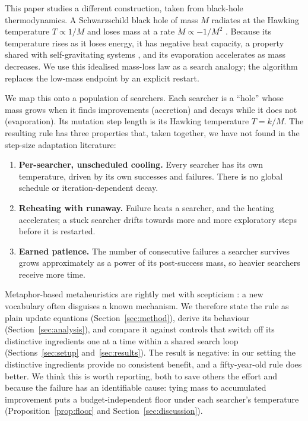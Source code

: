 \documentclass[10pt,a4paper]{article}
\begin{document}
This paper studies a different construction, taken from black-hole
thermodynamics. A Schwarzschild black hole of mass $M$ radiates at the Hawking
temperature $T \propto 1/M$ \citep{hawking1974,hawking1975} and loses mass at a
rate $\dot M \propto -1/M^2$ \citep{page1976}. Because its temperature rises as it
loses energy, it has negative heat capacity, a property shared with
self-gravitating systems \citep{lyndenbell1968,thirring1970}, and its evaporation
accelerates as mass decreases. We use this idealised mass-loss law as a search
analogy; the algorithm replaces the low-mass endpoint by an explicit restart.

We map this onto a population of searchers. Each searcher is a ``hole'' whose
mass grows when it finds improvements (accretion) and decays while it does not
(evaporation). Its mutation step length is its Hawking temperature $T = k/M$. The
resulting rule has three properties that, taken together, we have not found in the
step-size adaptation literature:
\begin{enumerate}
  \item \textbf{Per-searcher, unscheduled cooling.} Every searcher has its own
        temperature, driven by its own successes and failures. There is no global
        schedule or iteration-dependent decay.
  \item \textbf{Reheating with runaway.} Failure heats a searcher, and the heating
        accelerates; a stuck searcher drifts towards more and more exploratory steps
        before it is restarted.
  \item \textbf{Earned patience.} The number of consecutive failures a searcher
        survives grows approximately as a power of its post-success mass, so
        heavier searchers receive more time.
\end{enumerate}

Metaphor-based metaheuristics are rightly met with scepticism
\citep{sorensen2015,camacho2019}: a new vocabulary often disguises a known
mechanism. We therefore state the rule as plain update equations
(Section~\ref{sec:method}), derive its behaviour (Section~\ref{sec:analysis}), and
compare it against controls that switch off its distinctive ingredients one at a
time within a shared search loop (Sections~\ref{sec:setup}
and~\ref{sec:results}). The result is negative: in our setting the distinctive
ingredients provide no consistent benefit, and a fifty-year-old rule \citep{rechenberg1973} does
better. We think this is worth reporting, both to save others the effort and
because the failure has an identifiable cause: tying mass to accumulated
improvement puts a budget-independent floor under each searcher's temperature
(Proposition~\ref{prop:floor} and Section~\ref{sec:discussion}).
\end{document}
